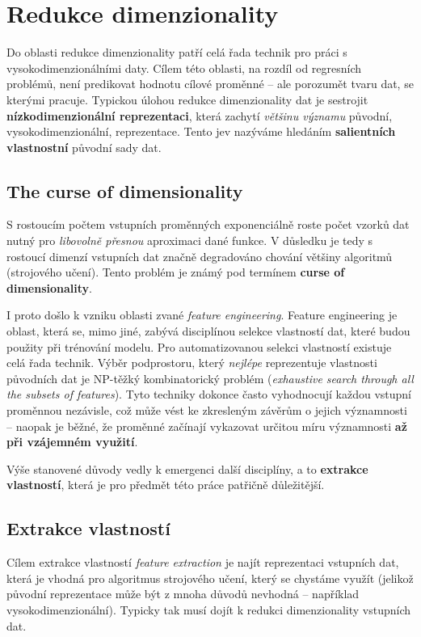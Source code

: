 \section{Redukce dimenzionality}
\label{sec:dimensionality_reduction}

Do oblasti redukce dimenzionality patří celá řada technik pro práci s vysokodimenzionálními daty.
Cílem této oblasti, na rozdíl od regresních problémů, není predikovat hodnotu cílové proměnné – ale porozumět tvaru dat, se kterými pracuje.
Typickou úlohou redukce dimenzionality dat je sestrojit \textbf{nízkodimenzionální reprezentaci}, která zachytí \emph{většinu významu} původní, vysokodimenzionální, reprezentace.
Tento jev nazýváme hledáním \textbf{salientních vlastnostní} původní sady dat. \cite{Phillips2021}

\subsection{The curse of dimensionality}
S rostoucím počtem vstupních proměnných exponenciálně roste počet vzorků dat nutný pro \emph{libovolně přesnou} aproximaci dané funkce.
V důsledku je tedy s rostoucí dimenzí vstupních dat značně degradováno chování většiny algoritmů (strojového učení).
Tento problém je známý pod termínem \textbf{curse of dimensionality}. \cite{Bellman1957}

I proto došlo k vzniku oblasti zvané \emph{feature engineering}.
Feature engineering je oblast, která se, mimo jiné, zabývá disciplínou selekce vlastností dat, které budou použity při trénování modelu.
Pro automatizovanou selekci vlastností existuje celá řada technik.
Výběr podprostoru, který \emph{nejlépe} reprezentuje vlastnosti původních dat je NP-těžký kombinatorický problém (\emph{exhaustive search through all the subsets of features}).
Tyto techniky dokonce často vyhodnocují každou vstupní proměnnou nezávisle, což může vést ke zkresleným závěrům o jejich významnosti – naopak je běžné, že proměnné začínají vykazovat určitou míru významnosti \textbf{až při vzájemném využití}. \cite{Stanczyk2015}

Výše stanovené důvody vedly k emergenci další disciplíny, a to \textbf{extrakce vlastností}, která je pro předmět této práce patřičně důležitější.

\subsection{Extrakce vlastností}
Cílem extrakce vlastností \emph{feature extraction} je najít reprezentaci vstupních dat, která je vhodná pro algoritmus strojového učení, který se chystáme využít (jelikož původní reprezentace může být z mnoha důvodů nevhodná – například vysokodimenzionální).
Typicky tak musí dojít k redukci dimenzionality vstupních dat. \cite{Liu1998}

